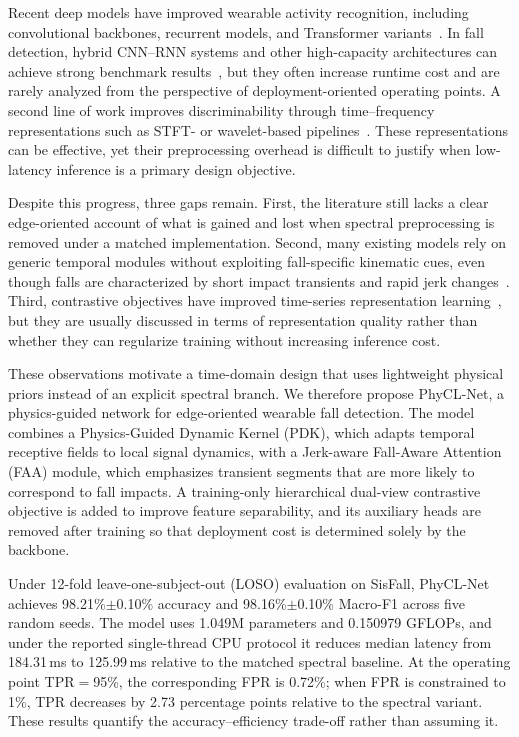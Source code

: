 \documentclass[jec]{acnsart}
\begin{document}
Recent deep models have improved wearable activity recognition, including convolutional backbones, recurrent models, and Transformer variants~\cite{wang2019deep,he2016resnet,hochreiter1997lstm,Vaswani2017Attention,Zeng2023TransformersEffective}. In fall detection, hybrid CNN--RNN systems and other high-capacity architectures can achieve strong benchmark results~\cite{Liu2023FallEnsemble,Butt2022FallLSTM}, but they often increase runtime cost and are rarely analyzed from the perspective of deployment-oriented operating points. A second line of work improves discriminability through time--frequency representations such as STFT- or wavelet-based pipelines~\cite{Zhang2022TFC}. These representations can be effective, yet their preprocessing overhead is difficult to justify when low-latency inference is a primary design objective.

Despite this progress, three gaps remain. First, the literature still lacks a clear edge-oriented account of what is gained and lost when spectral preprocessing is removed under a matched implementation. Second, many existing models rely on generic temporal modules without exploiting fall-specific kinematic cues, even though falls are characterized by short impact transients and rapid jerk changes~\cite{Kim2024GaitPattern}. Third, contrastive objectives have improved time-series representation learning~\cite{chen2020simclr,Eldele2021TSTCC,Zhang2022TFC}, but they are usually discussed in terms of representation quality rather than whether they can regularize training without increasing inference cost.

These observations motivate a time-domain design that uses lightweight physical priors instead of an explicit spectral branch. We therefore propose PhyCL-Net, a physics-guided network for edge-oriented wearable fall detection. The model combines a Physics-Guided Dynamic Kernel (PDK), which adapts temporal receptive fields to local signal dynamics, with a Jerk-aware Fall-Aware Attention (FAA) module, which emphasizes transient segments that are more likely to correspond to fall impacts. A training-only hierarchical dual-view contrastive objective is added to improve feature separability, and its auxiliary heads are removed after training so that deployment cost is determined solely by the backbone.

Under 12-fold leave-one-subject-out (LOSO) evaluation on SisFall, PhyCL-Net achieves 98.21\%$\pm$0.10\% accuracy and 98.16\%$\pm$0.10\% Macro-F1 across five random seeds. The model uses 1.049M parameters and 0.150979 GFLOPs, and under the reported single-thread CPU protocol it reduces median latency from 184.31\,ms to 125.99\,ms relative to the matched spectral baseline. At the operating point TPR${=}$95\%, the corresponding FPR is 0.72\%; when FPR is constrained to 1\%, TPR decreases by 2.73 percentage points relative to the spectral variant. These results quantify the accuracy--efficiency trade-off rather than assuming it.
\end{document}
